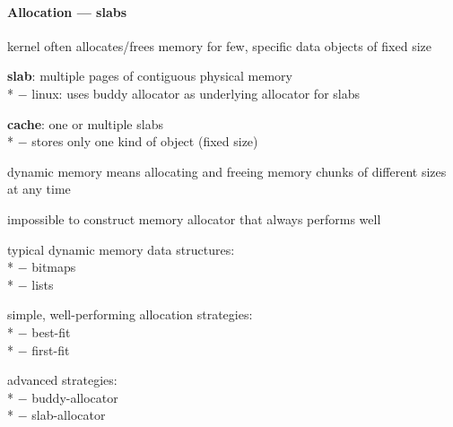 \paragraph{Allocation --- slabs}
\begin{items}
  \item kernel often allocates/frees memory for few, specific data objects of fixed size
  \item \textbf{slab}: multiple pages of contiguous physical memory \\*
    $ - $ linux: uses buddy allocator as underlying allocator for slabs
  \item \textbf{cache}: one or multiple slabs \\*
    $ - $ stores only one kind of object (fixed size)
\end{items}

\begin{summary}
  \begin{items}
    \item dynamic memory means allocating and freeing memory chunks of different sizes at any time
    \item impossible to construct memory allocator that always performs well
    \item typical dynamic memory data structures: \\*
      $ - $ bitmaps \\*
      $ - $ lists
    \item simple, well-performing allocation strategies: \\*
      $ - $ best-fit \\*
      $ - $ first-fit
    \item advanced strategies: \\*
      $ - $ buddy-allocator \\*
      $ - $ slab-allocator
  \end{items}
\end{summary}
